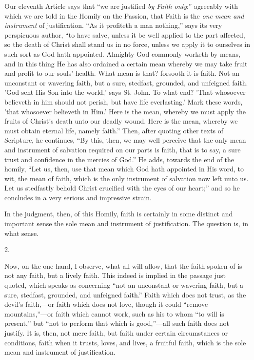 Our eleventh Article says that ``we are justified \emph{by Faith
only};'' agreeably with which we are told in the Homily on the
Passion, that Faith is the \emph{one mean and instrument} of
justification. ``As it profiteth a man nothing,'' says its
very perspicuous author, ``to have salve, unless it be well
applied to the part affected, so the death of Christ shall stand us in
no force, unless we apply it to ourselves in such sort as God hath
appointed. Almighty God commonly worketh by means, and in this thing
He has also ordained a certain mean whereby we may take fruit and
profit to our souls' health. What mean is that? forsooth it is faith.
Not an unconstant or wavering faith, but a sure, stedfast, grounded,
and unfeigned faith. 'God sent His Son into the world,' says St. John.
To what end? 'That whosoever believeth in him should not perish,
but have life everlasting.' Mark these words, 'that whosoever
believeth in Him.' Here is the mean, whereby we must apply the fruits
of Christ's death unto our deadly wound. Here is the mean, whereby we
must obtain eternal life, namely faith.'' Then, after quoting
other texts of Scripture, he continues, ``By this, then, we may
well perceive that the only mean and instrument of salvation required
on our parts is faith, that is to say, a sure trust and confidence in
the mercies of God.'' He adds, towards the end of the homily,
``Let us, then, use that mean which God hath appointed in His
word, to wit, the mean of faith, which is the only instrument of
salvation now left unto us. Let us stedfastly behold Christ crucified
with the eyes of our heart;'' and so he concludes in a very
serious and impressive strain.

In the judgment, then, of this Homily, faith is certainly in some
distinct and important sense the sole mean and instrument of
justification. The question is, in what sense.

2.

Now, on the one hand, I observe, what all will allow, that the
faith spoken of is not any faith, but a lively faith. This indeed is
implied in the passage just quoted, which speaks as concerning
``not an unconstant or wavering faith, but a sure, stedfast,
grounded, and unfeigned faith.'' Faith which does not trust, as
the devil's faith,—or faith which does not love, though it could
``remove mountains,''—or faith which cannot work, such as his to
whom ``to will is present,'' but ``not to perform that
which is good,''—all such faith does not justify. It is,
then, not mere faith, but faith under certain circumstances or
conditions, faith when it trusts, loves, and lives, a fruitful faith,
which is the sole mean and instrument of justification.

